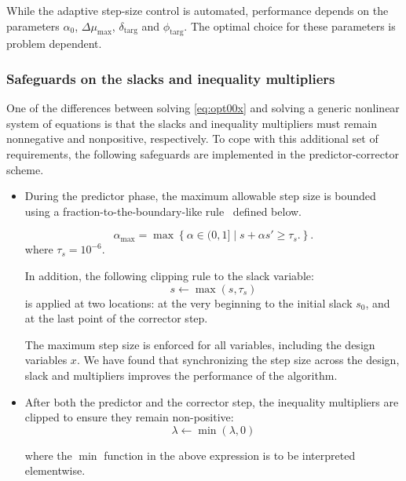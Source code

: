 \begin{remark}
  While the adaptive step-size control is automated, performance depends on the
  parameters $\alpha_0$, $\Delta \mu_{\max}$, $\delta_{\text{targ}}$ and
  $\phi_{\text{targ}}$.  The optimal choice for these parameters is problem
  dependent.
\end{remark}

\subsubsection{Safeguards on the slacks and inequality multipliers}\label{sec:fraction}
One of the differences between solving \eqref{eq:opt00x} and solving a generic
nonlinear system of equations is that the slacks and inequality multipliers must
remain nonnegative and nonpositive, respectively.  To cope with this additional
set of requirements, the following safeguards are implemented in the
predictor-corrector scheme.
\begin{itemize}
  \item During the predictor phase, the maximum allowable step size is bounded
    using a fraction-to-the-boundary-like rule~\cite{Nocedal2006NO} defined
    below.
    
  \begin{equation}\label{eq:f2b}
      \alpha_{\max} = \max\left\{
      \alpha \in (0,1] \;|\; s + \alpha s' \geq \tau_s .\right\}.
    \end{equation}
where $\tau_s = 10^{-6}$. 


In addition, the following clipping rule to the slack variable: 
\begin{equation}\label{eq:sclip}
    s \leftarrow \max(s, \tau_s)
\end{equation}
is applied at two locations: at the very beginning to the initial 
slack $s_0$, and at the last point of the corrector step. 

    The maximum step size is enforced for all variables, including the design
    variables $x$.  We have found that synchronizing the step size across the
    design, slack and multipliers improves the performance of the algorithm.
    
  \item After both the predictor and the corrector step,
  the inequality multipliers are clipped to
    ensure they remain non-positive:
    \begin{equation}\label{eq:lclip}
     \lambda \leftarrow \min(\lambda, 0)
    \end{equation}

    where the $\min$ function in the above expression is to be
    interpreted elementwise.  
\end{itemize}

